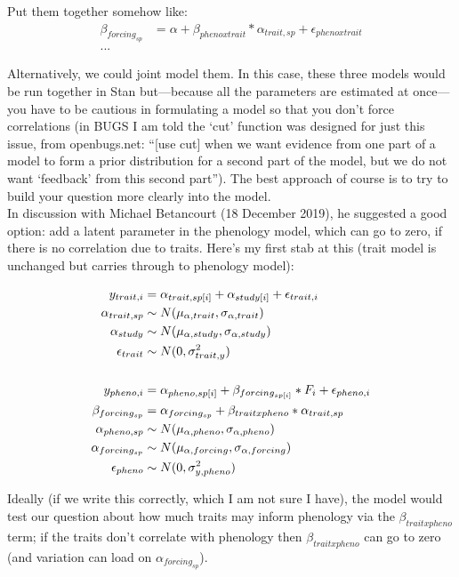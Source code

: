 \documentclass[11pt,letter]{article}
\begin{document}
Put them together somehow like:
\begin{align*}
\beta_{forcing_{sp}} &= \alpha + \beta_{pheno x trait}*\alpha_{trait, sp} + \epsilon_{pheno x trait}\\
...
\end{align*}

Alternatively, we could joint model them. In this case, these three models would be run together in Stan but---because all the parameters are estimated at once---you have to be cautious in formulating a model so that you don't force correlations (in BUGS I am told the `cut' function was designed for just this issue, from openbugs.net: ``[use cut] when we want evidence from one part of a model to form a prior distribution for a second part of the model, but we do not want `feedback' from this second part''). The best approach of course is to try to build your question more clearly into the model. \\

In discussion with Michael Betancourt (18 December 2019), he suggested a good option: add a latent parameter in the phenology model, which can go to zero, if there is no correlation due to traits. Here's my first stab at this (trait model is unchanged but carries through to phenology model):

\begin{align*}
y_{trait, i} &= \alpha_{trait, sp[i]} + \alpha_{study[i]} + \epsilon_{trait, i}\\
\alpha_{trait, sp} & \sim N(\mu_{\alpha, trait}, \sigma_{\alpha, trait}) \\
\alpha_{study}  & \sim N(\mu_{\alpha, study}, \sigma_{\alpha, study})\\
\epsilon_{trait} & \sim N(0,\sigma^2_{trait, y}) \\
\vspace{1ex}\\
y_{pheno, i} &= \alpha_{pheno, sp[i]} + \beta_{forcing_{sp[i]}}*F_i + \epsilon_{pheno, i}\\
\beta_{forcing_{sp}} & = \alpha_{forcing_{sp}} + \beta_{trait x pheno}*\alpha_{trait, sp} \\
\alpha_{pheno, sp} & \sim N(\mu_{\alpha, pheno}, \sigma_{\alpha, pheno}) \\
\alpha_{forcing_{sp}} & \sim N(\mu_{\alpha, forcing}, \sigma_{\alpha, forcing})\\
\epsilon_{pheno} & \sim N(0,\sigma^2_{y, pheno}) 
\end{align*}

Ideally (if we write this correctly, which I am not sure I have), the model would test our question about how much traits may inform phenology via the $\beta_{trait x pheno}$ term; if the traits don't correlate with phenology then $\beta_{trait x pheno}$ can go to zero (and variation can load on $\alpha_{forcing_{sp}}$).
\end{document}

